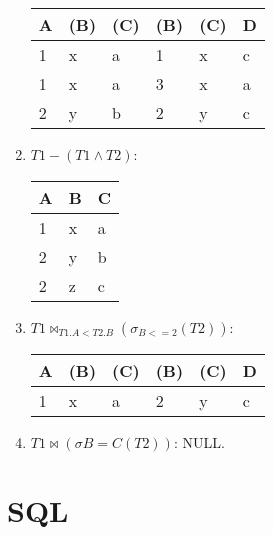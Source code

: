 \documentclass{article}
\begin{document}
\begin{enumerate}
\begin{table}[!h] \centering
\begin{tabular}{|l|l|l|l|l|l|}
\hline
\textbf{A} & \textbf{(B)} & \textbf{(C)} & \textbf{(B)} & \textbf{(C)} & \textbf{D} \\ \hline
1          & x            & a            & 1   & x   & c \\ \hline
1          & x            & a            & 3   & x   & a \\ \hline
2          & y            & b            & 2   & y   & c \\ \hline
\end{tabular}
\end{table}
    \item $T1 - (T1 \land T2)$:  
\begin{table}[!h] \centering
\begin{tabular}{|l|l|l|}
\hline
\textbf{A} & \textbf{B} & \textbf{C} \\ \hline
1          & x          & a          \\ \hline
2          & y          & b          \\ \hline
2          & z          & c          \\ \hline
\end{tabular}
\end{table}
    \item $T1 \bowtie_{T1.A < T2.B} (\sigma_{B<=2}(T2))$: 
    
\begin{table}[!h] \centering
\begin{tabular}{|l|l|l|l|l|l|}
\hline
\textbf{A} & \textbf{(B)} & \textbf{(C)} & \textbf{(B)} & \textbf{(C)} & \textbf{D} \\ \hline
1          & x            & a            & 2            & y            & c          \\ \hline
\end{tabular}
\end{table}
    \item $T1 \bowtie (\sigma{B=C}(T2))$: 
NULL. %
\end{enumerate}

\newpage
\section{SQL}
\end{document}
